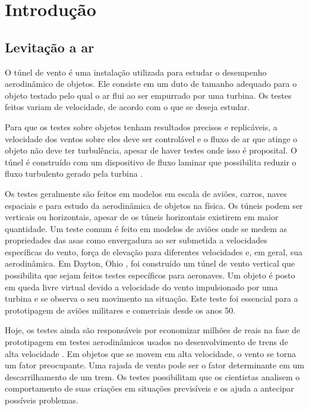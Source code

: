 
\chapter{Introdução} %

\section{Levitação a ar}

O túnel de vento é uma instalação utilizada para estudar o desempenho aerodinâmico de objetos. Ele consiste em um duto de tamanho adequado para o objeto testado pelo qual o ar flui ao ser empurrado por uma turbina. Os testes feitos variam de velocidade, de acordo com o que se deseja estudar.


Para que os testes sobre objetos tenham resultados precisos e replicáveis, a velocidade dos ventos sobre eles deve ser controlável e o fluxo de ar que atinge o objeto não deve ter turbulência, apesar de haver testes onde isso é proposital. O túnel é construído com um dispositivo de fluxo laminar que possibilita reduzir o fluxo turbulento gerado pela turbina \cite{mcdade1969}.


Os testes geralmente são feitos em modelos em escala de aviões, carros, naves espaciais e para  estudo da aerodinâmica de objetos na física. Os túneis podem ser verticais ou horizontais, apesar de os túneis horizontais existirem em maior quantidade. Um teste comum é feito em modelos de aviões onde se medem as propriedades das asas como envergadura ao ser submetida a velocidades específicas do vento, força de elevação para diferentes velocidades e, em geral, sua aerodinâmica. Em Dayton, Ohio \cite{vertical1946}, foi construído um túnel de vento vertical que possibilita que sejam feitos testes específicos para aeronaves. Um objeto é posto em queda livre virtual devido a velocidade do vento impulsionado por uma turbina e se observa o seu movimento na situação. Este teste foi essencial para a prototipagem de aviões militares e comerciais desde os anos 50.


Hoje, os testes ainda são responsáveis por economizar milhões de reais na fase de prototipagem em testes aerodinâmicos usados no desenvolvimento de trens de alta velocidade \cite{kwon2001}. Em objetos que se movem em alta velocidade, o vento se torna um fator preocupante. Uma rajada de vento pode ser o fator determinante em um descarrilhamento de um trem. Os testes possibilitam que os cientistas analisem o  comportamento de suas criações em situações previsíveis e os ajuda a antecipar possíveis problemas.

